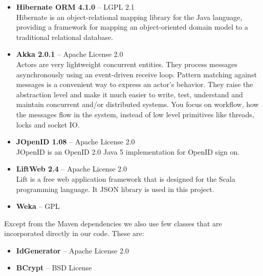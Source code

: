 \begin{itemize}
\item {\bf Hibernate ORM 4.1.0} -- LGPL 2.1 \\
Hibernate is an object-relational mapping library for the Java language, providing a framework for mapping an object-oriented domain model to a traditional relational database.

\item {\bf Akka 2.0.1} -- Apache License 2.0 \\
Actors are very lightweight concurrent entities. They process messages asynchronously using an event-driven receive loop. Pattern matching against messages is a convenient way to express an actor's behavior. They raise the abstraction level and make it much easier to write, test, understand and maintain concurrent and/or distributed systems. You focus on workflow, how the messages flow in the system, instead of low level primitives like threads, locks and socket IO.
 
\item {\bf JOpenID 1.08} -- Apache License 2.0 \\
JOpenID is an OpenID 2.0 Java 5 implementation for OpenID sign on.

\item {\bf LiftWeb 2.4} -- Apache License 2.0 \\
Lift is a free web application framework that is designed for the Scala programming language. It JSON library is used in this project.

\item {\bf Weka} -- {\huge\color{red}GPL}
\end{itemize}

Except from the Maven dependencies we also use few classes that are incorporated directly in our code. These are:

\begin{itemize}
\item {\bf IdGenerator} -- Apache License 2.0
\item {\bf BCrypt} -- BSD License
\end{itemize}


